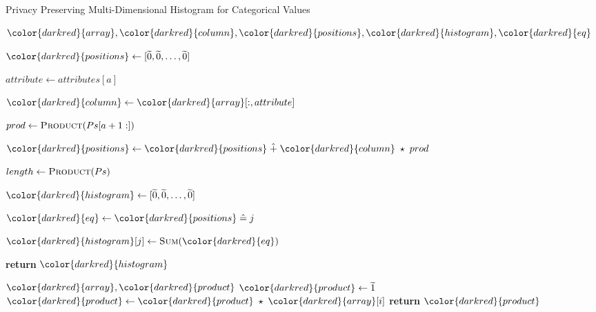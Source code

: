 \begin{algorithm}[H]
\caption{Privacy Preserving Multi-Dimensional Histogram for Categorical Values}\label{a:multidim-histogram-categorical}
\begin{algorithmic}[1]
\renewcommand{\algorithmicrequire}{\textbf{Private Vars:}}
\Require ${\color{darkred}{array}}, {\color{darkred}{column}}, {\color{darkred}{positions}}, {\color{darkred}{histogram}}, {\color{darkred}{eq}}$


    \State
    ${\color{darkred}{positions}} \gets [\enc{0}, \enc{0}, \dots, \enc{0}] $


      \State $attribute \gets attributes[a]$

      \State ${\color{darkred}{column}} \gets {\color{darkred}{array}}[:, attribute]$ 

      \State $prod \gets \textsc{Product}(Ps[a+1:])$ 

      \State ${\color{darkred}{positions}} \gets {\color{darkred}{positions}} \hplus {\color{darkred}{column}} \hmul prod$

    \EndFor

    \State $length \gets \textsc{Product}(Ps)$

    \State ${\color{darkred}{histogram}} \gets [\enc{0}, \enc{0}, \dots, \enc{0}]$



      \State ${\color{darkred}{eq}} \gets {\color{darkred}{positions}} \heq j$

      \State ${\color{darkred}{histogram}}[j] \gets \textsc{Sum}({\color{darkred}{eq}})$

    \EndFor

    \State \textbf{return} {${\color{darkred}{histogram}}$}
\EndProcedure

\begin{spacing}{0.5}
\end{spacing}

\Require ${\color{darkred}{array}}, {\color{darkred}{product}}$
    \State ${\color{darkred}{product}} \gets \enc{1}$
        \State ${\color{darkred}{product}} \gets {\color{darkred}{product}} \hmul {\color{darkred}{array}}[i]$
    \EndFor
    \State \textbf{return} {${\color{darkred}{product}}$}
\EndProcedure

\end{algorithmic}
\end{algorithm}
